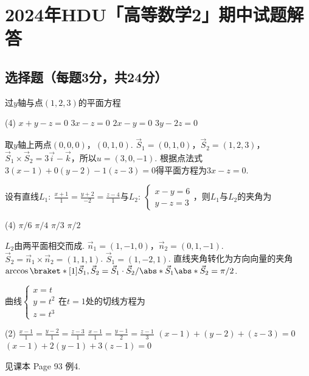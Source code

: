 \chapter*{2024年\textsf{HDU}「高等数学2」期中试题解答}



\section{选择题（每题3分，共24分）}

\begin{problem}
    过$y$轴与点$(1,2,3)$的平面方程
    \begin{tasks}(4)
        \task $x+y-z=0$
        \task[\true] $3x-z=0$
        \task $2x-y=0$
        \task $3y-2z=0$
    \end{tasks}
\end{problem}
\begin{solution}
    取$y$轴上两点$(0,0,0)$，$(0,1,0)$. $\vec S_1=(0,1,0)$，$\vec S_2=(1,2,3)$，$\vec S_1\times\vec S_2=3\vec i-\vec k$，所以$u=(3,0,-1)$. 根据点法式$3(x-1)+0(y-2)-1(z-3)=0$得平面方程为$3x-z=0$.
\end{solution}

\begin{problem}
    设有直线$L_1:\ \frac{x+1}{1}=\frac{y+2}{-2}=\frac{z-4}{1}$与$L_2:\ 
    \begin{cases}
        x-y=6\\
        y-z=3
    \end{cases}$，则$L_1$与$L_2$的夹角为
    \begin{tasks}(4)
        \task $\pi/6$
        \task $\pi/4$
        \task $\pi/3$
        \task[\true] $\pi/2$
    \end{tasks}
\end{problem}
\begin{solution}
    $L_2$由两平面相交而成. $\vec n_1=(1,-1,0)$，$\vec n_2=(0,1,-1)$. $\vec S_2=\vec n_1\times\vec n_2=(1,1,1)$. $\vec S_1=(1,-2,1)$. 直线夹角转化为方向向量的夹角$\arccos\braket*[1]{\vec S_1,\vec S_2}=\vec S_1\cdot\vec S_2/\abs*{\vec S_1}\abs*{\vec S_2}=\pi/2$.
\end{solution}

\begin{problem}
    曲线$\begin{cases}
        x=t\\y=t^2\\z=t^3
    \end{cases}$在$t=1$处的切线方程为
    \begin{tasks}(2)
        \task $\frac{x-1}{1}=\frac{y-2}{1}=\frac{z-3}{1}$
        \task[\true] $\frac{x-1}{1}=\frac{y-1}{2}=\frac{z-1}{3}$
        \task $(x-1)+(y-2)+(z-3)=0$
        \task $(x-1)+2(y-1)+3(z-1)=0$
    \end{tasks}
\end{problem}
\begin{solution}
    见课本 Page 93 例4.
\end{solution}

